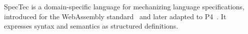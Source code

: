 SpecTec is a domain-specific language for mechanizing language specifications, introduced for the WebAssembly standard~\cite{youn24spectec} and later adapted to P4~\cite{lee26p4spectec}.
It expresses syntax and semantics as structured definitions.
